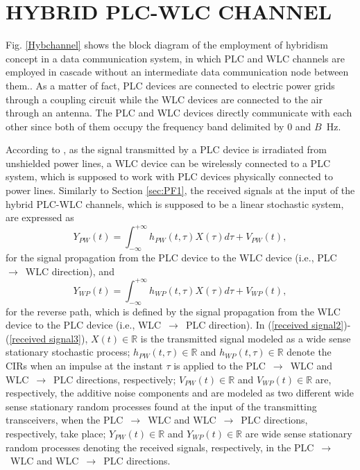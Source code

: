 \section{HYBRID PLC-WLC CHANNEL} \label{sec:PF2}

Fig. \ref{Hybchannel} shows the block diagram of the employment of hybridism concept in a data communication system, in which \ac{PLC} and \ac{WLC} channels are employed in cascade
without an intermediate data communication node between them.. As a matter of fact, \ac{PLC} devices are connected to electric power grids through a coupling circuit while the \ac{WLC} devices are connected to the air through an antenna. The \ac{PLC} and \ac{WLC} devices directly communicate with each other since both of them occupy the frequency band delimited by $0$ and $B$~Hz. 

According to \cite{thiago:hyb}, as the signal transmitted by a \ac{PLC} device is irradiated from unshielded power lines, a \ac{WLC} device can be  wirelessly connected to a \ac{PLC} system, which is supposed to work with \ac{PLC} devices physically connected to power lines. Similarly to Section \ref{sec:PF1}, the received signals at the input of the hybrid \ac{PLC}-\ac{WLC} channels, which is supposed to be a linear stochastic system, are expressed as
\begin{equation} \label{received signal2}
Y_{PW}(t) = \int_{-\infty}^{+\infty} h_{PW}(t,\tau) X(\tau) d\tau + V_{PW}(t),
\end{equation}
for the signal propagation from the \ac{PLC} device to the \ac{WLC} device (i.e., \ac{PLC}~$\rightarrow$~\ac{WLC} direction), and
\begin{equation} \label{received signal3}
Y_{WP}(t) = \int_{-\infty}^{+\infty} h_{WP}(t,\tau) X(\tau) d\tau + V_{WP}(t),
\end{equation}
for the reverse path, which is defined by the signal propagation from the \ac{WLC} device to the \ac{PLC} device (i.e., \ac{WLC}~$\rightarrow$~\ac{PLC} direction). In (\ref{received signal2})-(\ref{received signal3}),  $X(t)\in \mathbb{R}$ is the transmitted signal modeled as a wide sense stationary stochastic process; $h_{PW}(t,\tau)\in \mathbb{R}$ and $h_{WP}(t,\tau)\in \mathbb{R}$ denote the \acp{CIR} when an impulse at the instant $\tau$ is applied to the \ac{PLC}~$\rightarrow$~\ac{WLC} and \ac{WLC}~$\rightarrow$~\ac{PLC} directions, respectively; $V_{PW}(t)\in \mathbb{R}$ and $V_{WP}(t)\in \mathbb{R}$ are, respectively, the additive noise components and are modeled as two different wide sense stationary random processes found at the input of the transmitting transceivers, when the \ac{PLC}~$\rightarrow$~\ac{WLC} and \ac{WLC}~$\rightarrow$~\ac{PLC} directions, respectively, take place; $Y_{PW}(t)\in \mathbb{R}$ and ${Y}_{WP}(t)\in \mathbb{R}$ are wide sense stationary random processes denoting the received signals, respectively, in the \ac{PLC}~$\rightarrow$~\ac{WLC} and \ac{WLC}~$\rightarrow$~\ac{PLC} directions.

